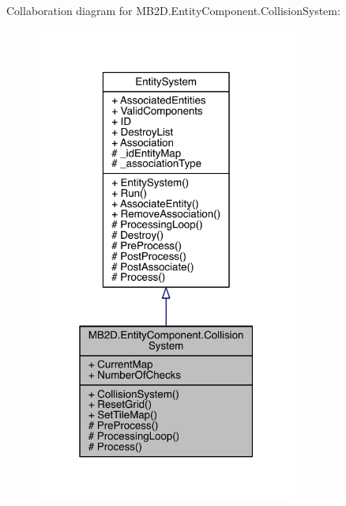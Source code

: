 Collaboration diagram for M\+B2\+D.\+Entity\+Component.\+Collision\+System\+:\nopagebreak
\begin{figure}[H]
\begin{center}
\leavevmode
\includegraphics[width=244pt]{class_m_b2_d_1_1_entity_component_1_1_collision_system__coll__graph}
\end{center}
\end{figure}
